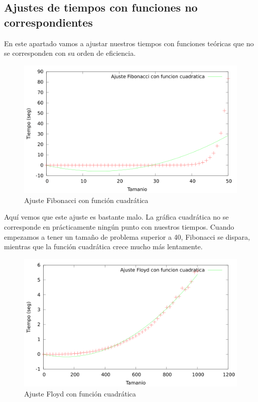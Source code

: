 \documentclass{article}
\begin{document}
	\subsection{Ajustes de tiempos con funciones no correspondientes}
	En este apartado vamos a ajustar nuestros tiempos con funciones teóricas que no se corresponden con su orden de eficiencia.
	\begin{figure}[H]
		\centering
		\includegraphics[totalheight=8cm]{img/ajusteFibonacci_cuadratico}
		\caption{Ajuste Fibonacci con función cuadrática}
		\label{fig:ajusteFibonacci_cuadratico}
	\end{figure}
	Aquí vemos que este ajuste es bastante malo. La gráfica cuadrática no se corresponde en prácticamente ningún punto con nuestros tiempos. Cuando empezamos a tener un tamaño de problema superior a 40, Fibonacci se dispara, mientras que la función cuadrática crece mucho más lentamente.
	\begin{figure}[H]
		\centering
		\includegraphics[totalheight=8cm]{img/ajusteFloyd_cuadratico}
		\caption{Ajuste Floyd con función cuadrática}
		\label{fig:ajusteFloyd_cuadratico}
	\end{figure}
\end{document}
